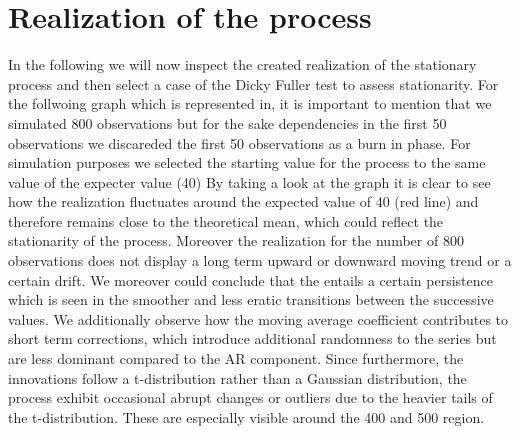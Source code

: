 \documentclass[a4paper,12pt]{article}
\begin{document}
\section{Realization of the process}
In the following we will now inspect the created realization of the stationary process and then select a case of the Dicky Fuller test to assess stationarity. 
For the follwoing graph which is represented in, it is important to mention that we simulated 800 observations but for the sake dependencies in the first 50 observations we discareded the first 50 observations as a burn in phase. For simulation purposes we selected the starting value for the process to the same value of the expecter value (40)
By taking a look at the graph it is clear to see how the realization fluctuates around the expected value of 40 (red line) and therefore remains close to the theoretical mean, which could reflect the stationarity of the process. Moreover the realization for the number of 800 observations does not display a long term upward or downward moving trend or a certain drift. 
We moreover could conclude that the entails a certain persistence which is seen in the smoother and less eratic transitions between the successive values. We additionally observe how the moving average coefficient contributes to short term corrections, which introduce additional randomness to the series but are less dominant compared to the AR component. Since furthermore, the innovations follow a t-distribution rather than a Gaussian distribution, the process exhibit occasional abrupt changes or outliers due to the heavier tails of the t-distribution. These are especially visible around the 400 and 500 region. 
\end{document}
